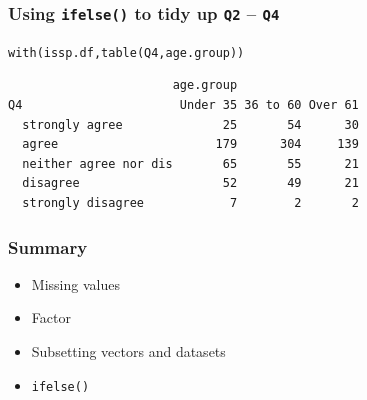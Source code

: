 \documentclass{beamer}\usepackage[]{graphicx}\usepackage[]{color}
\makeatletter
\newcommand{\hlstd}[1]{\textcolor[rgb]{0,0,0}{#1}}%
\newcommand{\hlkwd}[1]{\textcolor[rgb]{0,0.267,0.4}{#1}}%
\newenvironment{kframe}{%
 \def\at@end@of@kframe{}%
 \ifinner\ifhmode%
  \def\at@end@of@kframe{\end{minipage}}%
  \begin{minipage}{\columnwidth}%
 \fi\fi%
 \def\FrameCommand##1{\hskip\@totalleftmargin \hskip-\fboxsep
 \colorbox{shadecolor}{##1}\hskip-\fboxsep
     \hskip-\linewidth \hskip-\@totalleftmargin \hskip\columnwidth}%
 \MakeFramed {\advance\hsize-\width
   \@totalleftmargin\z@ \linewidth\hsize
   \@setminipage}}%
 {\par\unskip\endMakeFramed%
 \at@end@of@kframe}
\newenvironment{knitrout}{}{} %
\makeatother
\begin{document}
\begin{frame}[fragile]
  \frametitle{Using \texttt{ifelse()} to tidy up \texttt{Q2} -- \texttt{Q4}}
\begin{knitrout}
\color{fgcolor}\begin{kframe}
\begin{alltt}
\hlkwd{with}\hlstd{(issp.df,} \hlkwd{table}\hlstd{(Q4, age.group))}
\end{alltt}
\begin{verbatim}
                       age.group
Q4                      Under 35 36 to 60 Over 61
  strongly agree              25       54      30
  agree                      179      304     139
  neither agree nor dis       65       55      21
  disagree                    52       49      21
  strongly disagree            7        2       2
\end{verbatim}
\end{kframe}
\end{knitrout}
\end{frame}

\begin{frame}[fragile]
  \frametitle{Summary}
  \begin{itemize}
  \item Missing values
  \item Factor
  \item Subsetting vectors and datasets
  \item \texttt{ifelse()}
  \end{itemize}
\end{frame}
\end{document}
